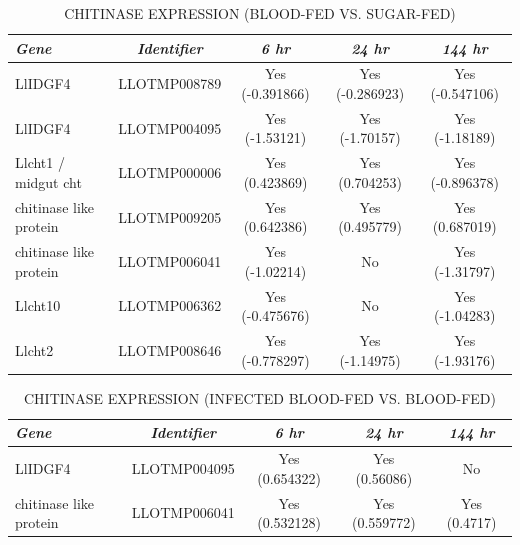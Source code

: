 \begin{table}[H]
  \begin{center}
  \caption{\label{tab:sandflies:stat-sig-chitinases-sb} CHITINASE EXPRESSION (BLOOD-FED VS. SUGAR-FED)}
  \begin{tabular}{ p{1.5cm} c c c c } \hline
    \emph{Gene} & \emph{Identifier} & \emph{6 hr} & \emph{24 hr} & \emph{144 hr} \\ \hline
    LlIDGF4 & LLOTMP008789 & Yes (-0.391866) & Yes (-0.286923) & Yes (-0.547106) \\
    LlIDGF4 & LLOTMP004095 & Yes (-1.53121) & Yes (-1.70157) & Yes (-1.18189) \\
    Llcht1 / midgut cht & LLOTMP000006 & Yes (0.423869) & Yes (0.704253) & Yes (-0.896378) \\
    chitinase like protein & LLOTMP009205 & Yes (0.642386) & Yes (0.495779) & Yes (0.687019) \\
    chitinase like protein & LLOTMP006041 & Yes (-1.02214) & No & Yes (-1.31797) \\
    Llcht10 & LLOTMP006362 & Yes (-0.475676) & No & Yes (-1.04283) \\
    Llcht2 & LLOTMP008646 & Yes (-0.778297) & Yes (-1.14975) & Yes (-1.93176)
  \end{tabular}
  \end{center}
\end{table}

\begin{table}[H]
  \begin{center}
  \caption{\label{tab:sandflies:stat-sig-chitinases-bi} CHITINASE EXPRESSION (INFECTED BLOOD-FED VS. BLOOD-FED)}
  \begin{tabular}{ p{1.5cm} c c c c } \hline
    \emph{Gene} & \emph{Identifier} & \emph{6 hr} & \emph{24 hr} & \emph{144 hr} \\ \hline
    LlIDGF4 & LLOTMP004095 & Yes (0.654322) & Yes (0.56086) & No \\
    chitinase like protein & LLOTMP006041 & Yes (0.532128) & Yes (0.559772) & Yes (0.4717)
  \end{tabular}
  \end{center}
\end{table}


